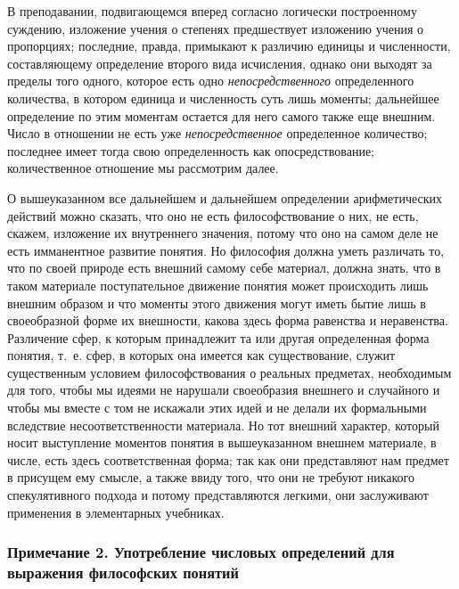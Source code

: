 В преподавании, подвигающемся вперед согласно логически построенному
суждению, изложение учения о степенях предшествует изложению учения о
пропорциях; последние, правда, примыкают к различию единицы и численности,
составляющему определение второго вида исчисления, однако они выходят за
пределы того одного, которое есть одно
{\em непосредственного} определенного количества, в
котором единица и численность суть лишь моменты; дальнейшее определение по
этим моментам остается для него
самого также еще внешним. Число в отношении не есть уже
{\em непосредственное} определенное количество;
последнее имеет тогда свою определенность как опосредствование;
количественное отношение мы рассмотрим
далее.

О вышеуказанном все дальнейшем и дальнейшем определении арифметических
действий можно сказать, что оно не есть философствование о них, не есть,
скажем, изложение их внутреннего значения, потому что оно на самом деле не
есть имманентное развитие понятия. Но философия должна уметь различать то,
что по своей природе есть внешний самому себе материал, должна знать, что в
таком материале поступательное движение понятия может происходить лишь
внешним образом и что моменты этого движения могут иметь бытие лишь в
своеобразной форме их внешности, какова здесь форма равенства и
неравенства. Различение сфер, к которым принадлежит та или другая
определенная форма понятия, т.~е. сфер, в которых она имеется как
существование, служит существенным условием философствования о реальных
предметах, необходимым для того, чтобы мы идеями не нарушали своеобразия
внешнего и случайного и чтобы мы вместе с том не искажали этих идей и не
делали их формальными вследствие несоответственности материала. Но тот
внешний характер, который носит выступление моментов понятия в
вышеуказанном внешнем материале, в числе, есть здесь соответственная форма;
так как они представляют нам предмет в присущем ему смысле, а также ввиду
того, что они не требуют никакого спекулятивного подхода и потому
представляются легкими, они заслуживают применения в элементарных
учебниках.

\subsubsection[Примечание 2. Употребление числовых определений для выражения философских понятий]
{Примечание 2. Употребление числовых определений для выражения философских понятий}

